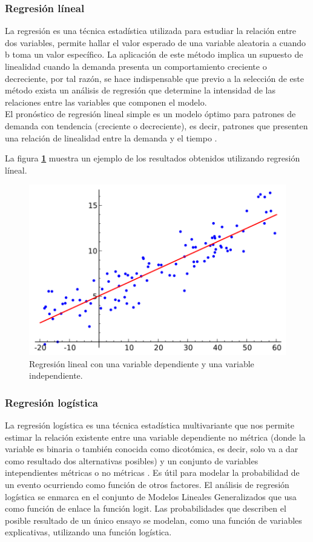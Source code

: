 \subsubsection{Regresión líneal}
La regresión es una técnica estadística utilizada para estudiar la relación entre dos variables, permite hallar el valor esperado de 
una variable aleatoria a cuando b toma un valor específico. La aplicación de este método implica un supuesto de linealidad cuando 
la demanda presenta un comportamiento creciente o decreciente, por tal razón, se hace indispensable que previo a la selección de 
este método exista un análisis de regresión que determine la intensidad de las relaciones entre las variables que componen el modelo.
\\
El pronóstico de regresión lineal simple es un modelo óptimo para patrones de demanda con tendencia (creciente o decreciente), 
es decir, patrones que presenten una relación de linealidad entre la demanda y el tiempo \citep{CT5}.

La figura \textbf{\ref{fig:RL}} muestra un ejemplo de los resultados obtenidos utilizando regresión líneal. 

\begin{figure}[H]
  \centering
  \includegraphics[scale=.6]{imagenes/Capitulo3/regresionLineal}
  \caption{Regresión lineal con una variable dependiente y una variable independiente.}
  \label{fig:RL}
\end{figure}

\subsubsection{Regresión logística}
La regresión logística es una técnica estadística multivariante que nos permite estimar la relación existente entre una variable dependiente 
no métrica (donde la variable es binaria o también conocida como dicotómica, es decir, solo va a dar como resultado dos alternativas posibles) 
y un conjunto de variables intependientes métricas o no métricas \citep{CT6}. Es útil para modelar la probabilidad de un evento ocurriendo como 
función de otros factores. El análisis de regresión logística se enmarca en el conjunto de Modelos Lineales Generalizados que usa como función de 
enlace la función logit. Las probabilidades que describen el posible resultado de un único ensayo se modelan, como una función de variables explicativas, 
utilizando una función logística.

